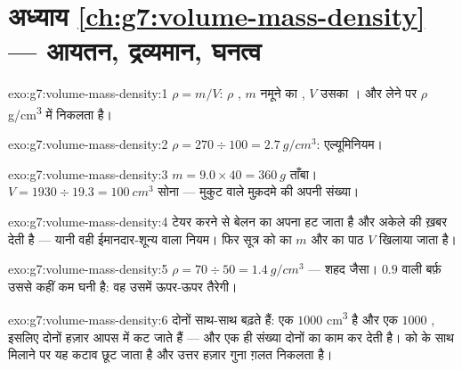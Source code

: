 \section*{अध्याय \ref{ch:g7:volume-mass-density} --- आयतन, द्रव्यमान, घनत्व}

\begin{solution}{exo:g7:volume-mass-density:1}
$\rho = m/V$: $\rho$ , $m$ नमूने का , $V$ उसका ।
 और  लेने पर $\rho$ \unit{g/cm^3} में निकलता है।
\end{solution}

\begin{solution}{exo:g7:volume-mass-density:2}
$\rho = 270 \div 100 = \qty{2.7}{g/cm^3}$: एल्यूमिनियम।
\end{solution}

\begin{solution}{exo:g7:volume-mass-density:3}
$m = 9.0 \times 40 = \qty{360}{g}$ ताँबा।
$V = 1930 \div 19.3 = \qty{100}{cm^3}$ सोना --- मुकुट वाले मुक़दमे
की अपनी संख्या।
\end{solution}

\begin{solution}{exo:g7:volume-mass-density:4}
टेयर करने से बेलन का अपना  हट जाता है और  अकेले  की
ख़बर देती है --- यानी वही ईमानदार-शून्य वाला नियम। फिर सूत्र को 
का  $m$ और  का पाठ $V$ खिलाया जाता है।
\end{solution}

\begin{solution}{exo:g7:volume-mass-density:5}
$\rho = 70 \div 50 = \qty{1.4}{g/cm^3}$ --- शहद जैसा। $0.9$ वाली
बर्फ़ उससे कहीं कम घनी है: वह उसमें ऊपर-ऊपर तैरेगी।
\end{solution}

\begin{solution}{exo:g7:volume-mass-density:6}
दोनों  साथ-साथ बढ़ते हैं: एक  $1000$ \unit{cm^3} है और एक
 $1000$ , इसलिए दोनों हज़ार आपस में कट जाते हैं --- और
एक ही संख्या दोनों का काम कर देती है।  को  के साथ मिलाने पर
यह कटाव छूट जाता है और उत्तर हज़ार गुना ग़लत निकलता है।
\end{solution}

